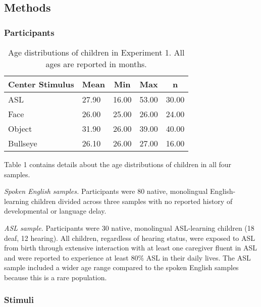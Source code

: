 \documentclass[english,floatsintext,man]{apa6}
\begin{document}
\hypertarget{methods}{%
\subsection{Methods}\label{methods}}

\hypertarget{participants}{%
\subsubsection{Participants}\label{participants}}

\begin{table}[tbp]
\begin{center}
\begin{threeparttable}
\caption{\label{tab:trio make participants table}Age distributions of children in Experiment 1. All ages are reported in months.}
\begin{tabular}{lllll}
\toprule
Center Stimulus & \multicolumn{1}{c}{Mean} & \multicolumn{1}{c}{Min} & \multicolumn{1}{c}{Max} & \multicolumn{1}{c}{n}\\
\midrule
ASL & 27.90 & 16.00 & 53.00 & 30.00\\
Face & 26.00 & 25.00 & 26.00 & 24.00\\
Object & 31.90 & 26.00 & 39.00 & 40.00\\
Bullseye & 26.10 & 26.00 & 27.00 & 16.00\\
\bottomrule
\end{tabular}
\end{threeparttable}
\end{center}
\end{table}

Table 1 contains details about the age distributions of children in all
four samples.

\emph{Spoken English samples.} Participants were 80 native, monolingual
English-learning children divided across three samples with no reported
history of developmental or language delay.

\emph{ASL sample.} Participants were 30 native, monolingual ASL-learning
children (18 deaf, 12 hearing). All children, regardless of hearing
status, were exposed to ASL from birth through extensive interaction
with at least one caregiver fluent in ASL and were reported to
experience at least 80\% ASL in their daily lives. The ASL sample
included a wider age range compared to the spoken English samples
because this is a rare population.

\hypertarget{stimuli}{%
\subsubsection{Stimuli}\label{stimuli}}
\end{document}
